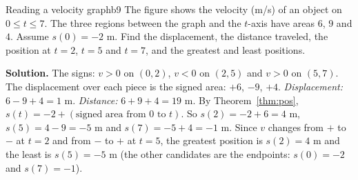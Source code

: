 \documentclass[11pt]{article}
\begin{document}
\begin{exmp}{Reading a velocity graph}{b9}
The figure shows the velocity (m/s) of an object on $0\le t\le7$. The three regions between the graph and the $t$-axis have areas $6$, $9$ and $4$. Assume $s(0)=-2$ m. Find the displacement, the distance traveled, the position at $t=2$, $t=5$ and $t=7$, and the greatest and least positions.

\begin{center}
\end{center}

\textbf{Solution.} The signs: $v>0$ on $(0,2)$, $v<0$ on $(2,5)$ and $v>0$ on $(5,7)$. The displacement over each piece is the signed area: $+6$, $-9$, $+4$. \emph{Displacement:} $6-9+4=1$ m. \emph{Distance:} $6+9+4=19$ m.
By Theorem~\ref{thm:pos}, $s(t)=-2+(\text{signed area from }0\text{ to }t)$. So $s(2)=-2+6=4$ m, $s(5)=4-9=-5$ m and $s(7)=-5+4=-1$ m. Since $v$ changes from $+$ to $-$ at $t=2$ and from $-$ to $+$ at $t=5$, the greatest position is $s(2)=4$ m and the least is $s(5)=-5$ m (the other candidates are the endpoints: $s(0)=-2$ and $s(7)=-1$).
\end{exmp}
\end{document}
